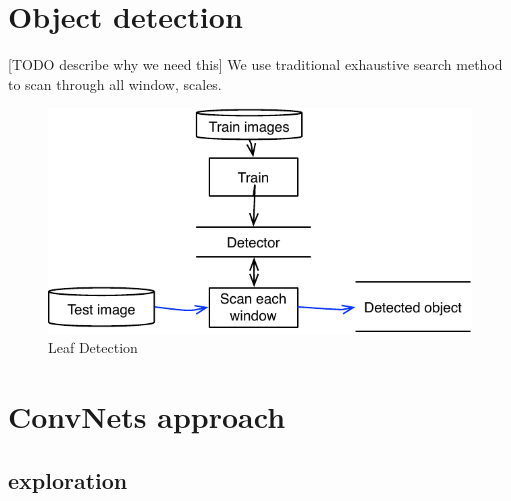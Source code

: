 \documentclass[journal, 10pt]{IEEEtran}
\begin{document}

\section{Object detection }
[TODO describe why we need this]
We use traditional exhaustive search method to scan through all window, scales.

\newpage
\begin{figure}
  \center
  \includegraphics[scale=0.5]{detection}
  \caption{ Leaf Detection }
  \label{fig:detection}
\end{figure}

\section{ConvNets approach}
  \subsection{exploration}
\end{document}
